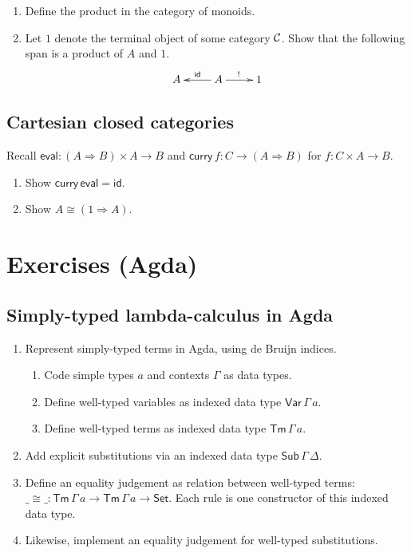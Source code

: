 \documentclass[a4paper,fleqn]{scrartcl}
\newcommand{\wttm}{\ensuremath{\mathsf{Tm}\,\Gamma\,a}}
\newcommand{\tid}{\mathsf{id}}
\newcommand{\To}{\Rightarrow}
\newcommand{\too}{\longrightarrow}
\newcommand{\tcurry}{\mathsf{curry}}
\newcommand{\teval}{\mathsf{eval}}
\begin{document}
\begin{enumerate}
\item Define the product in the category of monoids.
\item Let $1$ denote the terminal object of some category $\mathcal{C}$.
  Show that the following span is a product of $A$ and $1$.
\[
\xymatrix{
  A & A \ar[l]_{\tid} \ar[r]^{!} & 1
}
\]
\end{enumerate}

\subsection{Cartesian closed categories}

Recall $\teval : (A \To B) \times A \too B$ and
$\tcurry\, f : C \too (A \To B)$ for $f : C \times A \too B$.
\begin{enumerate}
\item Show $\tcurry\,\teval = \tid$.
\item Show $A \cong (1 \To A)$.
\end{enumerate}

\clearpage

\section{Exercises (Agda)}

\subsection{Simply-typed lambda-calculus in Agda}

\begin{enumerate}
\item Represent simply-typed terms in Agda, using de Bruijn indices.
  \begin{enumerate}
  \item Code simple types $a$ and contexts $\Gamma$ as data types.
  \item Define well-typed variables as indexed data type
    $\mathsf{Var}\,\Gamma\,a$.
  \item Define well-typed terms as indexed data type \wttm.
  \end{enumerate}
\item Add explicit substitutions via an indexed data type
  $\mathsf{Sub}\,\Gamma\,\Delta$.
\item Define an equality judgement as relation between well-typed
  terms: ${\_{\cong}\_} : \wttm \to \wttm \to \mathsf{Set}$.
  Each rule is one constructor of this indexed data type.
\item Likewise, implement an equality judgement for well-typed substitutions.
\end{enumerate}
\end{document}
